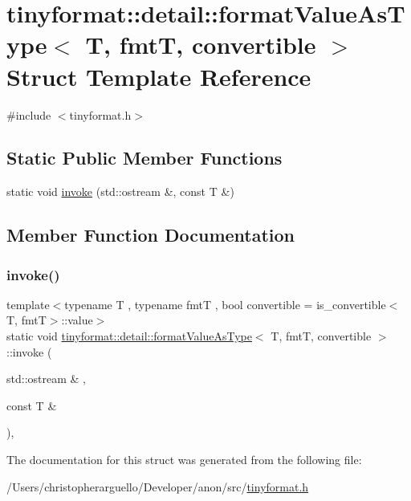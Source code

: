 \hypertarget{structtinyformat_1_1detail_1_1format_value_as_type}{}\section{tinyformat\+:\+:detail\+:\+:format\+Value\+As\+Type$<$ T, fmtT, convertible $>$ Struct Template Reference}
\label{structtinyformat_1_1detail_1_1format_value_as_type}


{\ttfamily \#include $<$tinyformat.\+h$>$}

\subsection*{Static Public Member Functions}
\begin{DoxyCompactItemize}
\item 
static void \mbox{\hyperlink{structtinyformat_1_1detail_1_1format_value_as_type_a126bc5958024c456851f08fa380d1cac}{invoke}} (std\+::ostream \&, const T \&)
\end{DoxyCompactItemize}


\subsection{Member Function Documentation}
\mbox{\label{structtinyformat_1_1detail_1_1format_value_as_type_a126bc5958024c456851f08fa380d1cac}} 
\subsubsection{\texorpdfstring{invoke()}{invoke()}}
{\footnotesize\ttfamily template$<$typename T , typename fmtT , bool convertible = is\+\_\+convertible$<$\+T, fmt\+T$>$\+::value$>$ \\
static void \mbox{\hyperlink{structtinyformat_1_1detail_1_1format_value_as_type}{tinyformat\+::detail\+::format\+Value\+As\+Type}}$<$ T, fmtT, convertible $>$\+::invoke (\begin{DoxyParamCaption}\item[{std\+::ostream \&}]{,  }\item[{const T \&}]{ }\end{DoxyParamCaption})\hspace{0.3cm}{\ttfamily [inline]}, {\ttfamily [static]}}



The documentation for this struct was generated from the following file\+:\begin{DoxyCompactItemize}
\item 
/\+Users/christopherarguello/\+Developer/anon/src/\mbox{\hyperlink{tinyformat_8h}{tinyformat.\+h}}\end{DoxyCompactItemize}
